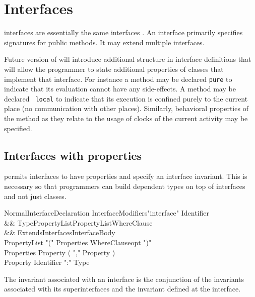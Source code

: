 \chapter{Interfaces}
\label{XtenInterfaces}

{}\XtenCurrVer{} interfaces are essentially the same \java{}
interfaces \cite[\S 9]{jls2}. An interface primarily specifies
signatures for public methods. It may extend multiple interfaces. 


Future version of \Xten{} will introduce additional structure in
interface definitions that will allow the programmer to state
additional properties of classes that implement that interface. For
instance a method may be declared {\tt pure} to indicate that its
evaluation cannot have any side-effects. A method may be declared {\tt
local} to indicate that its execution is confined purely to the
current place (no communication with other places). Similarly,
behavioral properties of the method as they relate to the usage of
clocks of the current activity may be specified.

\section{Interfaces with properties}\label{DepType:Interface}

\Xten{} permits interfaces to have properties and specify an interface
invariant. This is necessary so that programmers can build dependent
types on top of interfaces and not just classes.

\begin{grammar}
NormalInterfaceDeclaration \:
      InterfaceModifiers\opt \xcd"interface" Identifier  \\
   && TypePropertyList\opt PropertyList\opt WhereClause\opt \\
   && ExtendsInterfaces\opt InterfaceBody \\
PropertyList     \: \xcd"(" Properties WhereClauseopt \xcd")" \\
Properties       \: Property ( \xcd"," Property )\star \\
Property         \: Identifier \xcd":" Type \\
\end{grammar}
The invariant associated with an interface is the conjunction of the
invariants associated with its superinterfaces and the invariant
defined at the interface. 


